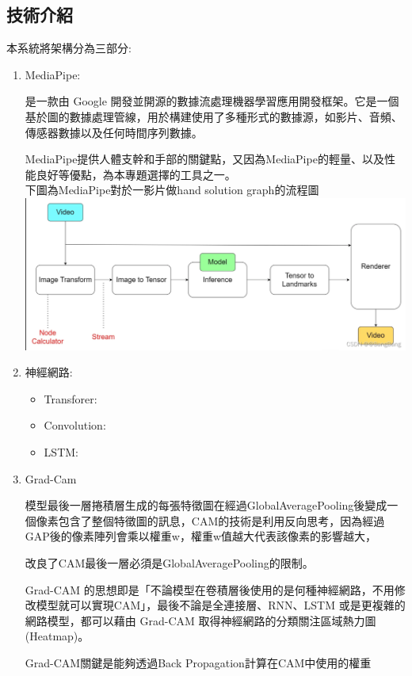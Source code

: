 \documentclass[12pt,a4paper]{report}
\begin{document}
\begin{CJK*}{UTF8}{bkai}
    \section{技術介紹}
    \par
    本系統將架構分為三部分:
    \begin{enumerate}
        \item MediaPipe:
              \par
              是一款由 Google 開發並開源的數據流處理機器學習應用開發框架。它是一個基於圖的數據處理管線，用於構建使用了多種形式的數據源，如影片、音頻、傳感器數據以及任何時間序列數據。
              \par
              MediaPipe提供人體支幹和手部的關鍵點，又因為MediaPipe的輕量、以及性能良好等優點，為本專題選擇的工具之一。\\
              下圖為MediaPipe對於一影片做hand solution graph的流程圖\\
              \includegraphics[width=5in]{mediapipe.png}
        \item 神經網路:
              \begin{itemize}
                  \item Transforer:
                        \par

                  \item Convolution:
                        \par

                  \item LSTM:
                        \par

              \end{itemize}
        \item Grad-Cam
              \par
              模型最後一層捲積層生成的每張特徵圖在經過GlobalAveragePooling後變成一個像素包含了整個特徵圖的訊息，CAM的技術是利用反向思考，因為經過GAP後的像素陣列會乘以權重w，權重w值越大代表該像素的影響越大，
              \par
              改良了CAM最後一層必須是GlobalAveragePooling的限制。
              \par
              Grad-CAM 的思想即是「不論模型在卷積層後使用的是何種神經網路，不用修改模型就可以實現CAM」，最後不論是全連接層、RNN、LSTM 或是更複雜的網路模型，都可以藉由 Grad-CAM 取得神經網路的分類關注區域熱力圖(Heatmap)。
              \par
              Grad-CAM關鍵是能夠透過Back Propagation計算在CAM中使用的權重\\
    \end{enumerate}


\end{CJK*}
\end{document}
